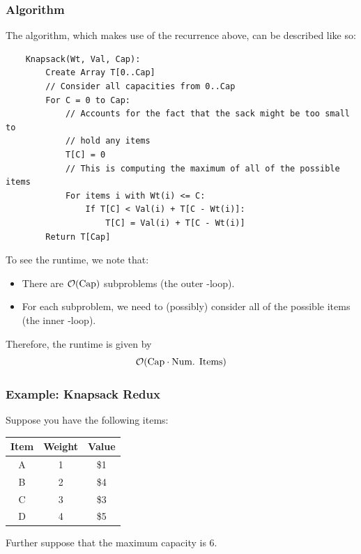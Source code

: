 \documentclass[letterpaper]{article}
\begin{document}
\subsubsection{Algorithm}
The algorithm, which makes use of the recurrence above, can be described like so: 
\begin{verbatim}
    Knapsack(Wt, Val, Cap):
        Create Array T[0..Cap]
        // Consider all capacities from 0..Cap 
        For C = 0 to Cap: 
            // Accounts for the fact that the sack might be too small to 
            // hold any items
            T[C] = 0
            // This is computing the maximum of all of the possible items
            For items i with Wt(i) <= C:
                If T[C] < Val(i) + T[C - Wt(i)]:
                    T[C] = Val(i) + T[C - Wt(i)]
        Return T[Cap]
\end{verbatim}
To see the runtime, we note that: 
\begin{itemize}
    \item There are $\mathcal{O}(\text{Cap})$ subproblems (the outer -loop).
    \item For each subproblem, we need to (possibly) consider all of the possible items (the inner -loop).
\end{itemize}
Therefore, the runtime is given by 
\[\mathcal{O}(\text{Cap} \cdot \text{Num. Items})\]

\subsubsection{Example: Knapsack Redux}
Suppose you have the following items: 
\begin{center}
    \begin{tabular}{c|c|c}
        \textbf{Item} & \textbf{Weight} & \textbf{Value} \\ 
        \hline 
        A & 1 & \$1 \\ 
        B & 2 & \$4 \\ 
        C & 3 & \$3 \\ 
        D & 4 & \$5
    \end{tabular}
\end{center}
Further suppose that the maximum capacity is 6. 
\end{document}

